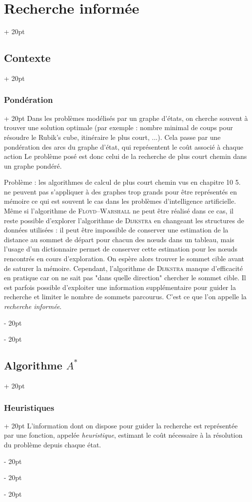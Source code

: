 \documentclass[a4paper, 12pt, twoside]{article}
\newcommand{\ind}[1][20pt]{\advance\leftskip + #1}
\newcommand{\deind}[1][20pt]{\advance\leftskip - #1}
\newenvironment{indt}[2][20pt]{#2 \par \ind[#1]}{\par \deind} %
\begin{document}
\begin{indt}{\section{Recherche informée}}
\begin{indt}{\subsection{Contexte}}
            \vspace{12pt}
            
            \begin{indt}{\subsubsection{Pondération}}
                Dans les problèmes modélisés par un graphe d'états, on cherche souvent à trouver une solution optimale (par exemple : nombre minimal de coups pour résoudre le Rubik's cube, itinéraire le plus court, ...). Cela passe par une pondération des arcs du graphe d'état, qui représentent le coût associé à chaque action Le problème posé est donc celui de la recherche de plus court chemin dans un graphe pondéré.

                Problème : les algorithmes de calcul de plus court chemin vus en chapitre 10 5. ne peuvent pas s'appliquer à des graphes trop grands pour être représentés en mémoire ce qui est souvent le cas dans les problèmes d'intelligence artificielle.
                Même si l'algorithme de \textsc{Floyd--Warshall} ne peut être réalisé dans ce cas, il reste possible d'explorer l'algorithme de \textsc{Dijkstra} en changeant les structures de données utilisées : il peut être impossible de conserver une estimation de la distance au sommet de départ pour chacun des n\oe uds dans un tableau, mais l'usage d'un dictionnaire permet de conserver cette estimation pour les n\oe uds rencontrés en cours d'exploration.
                On espère alors trouver le sommet cible avant de saturer la mémoire.
                Cependant, l'algorithme de \textsc{Dijkstra} manque d'efficacité en pratique car on ne sait pas "dans quelle direction" chercher le sommet cible. Il est parfois possible d'exploiter une information supplémentaire pour guider la recherche et limiter le nombre de sommets parcourus.
                C'est ce que l'on appelle la \emph{recherche informée}.
            \end{indt}
        \end{indt}

        \begin{indt}{\subsection{Algorithme $A^*$}}
            \begin{indt}{\subsubsection{Heuristiques}}
                L'information dont on dispose pour guider la recherche est représentée par une fonction, appelée \emph{heuristique}, estimant le coût nécessaire à la résolution du problème depuis chaque état.


\end{indt}
\end{indt}
\end{indt}
\end{document}
